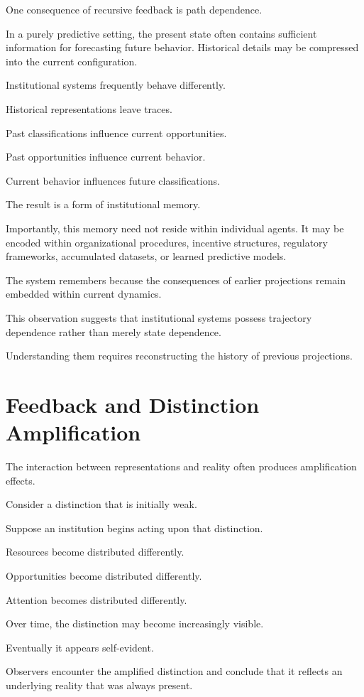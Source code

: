 \documentclass[11pt,oneside,openany]{book}
\begin{document}
One consequence of recursive feedback is path dependence.

In a purely predictive setting, the present state often contains sufficient information for forecasting future behavior. Historical details may be compressed into the current configuration.

Institutional systems frequently behave differently.

Historical representations leave traces.

Past classifications influence current opportunities.

Past opportunities influence current behavior.

Current behavior influences future classifications.

The result is a form of institutional memory.

Importantly, this memory need not reside within individual agents. It may be encoded within organizational procedures, incentive structures, regulatory frameworks, accumulated datasets, or learned predictive models.

The system remembers because the consequences of earlier projections remain embedded within current dynamics.

This observation suggests that institutional systems possess trajectory dependence rather than merely state dependence.

Understanding them requires reconstructing the history of previous projections.

\section{Feedback and Distinction Amplification}

The interaction between representations and reality often produces amplification effects.

Consider a distinction that is initially weak.

Suppose an institution begins acting upon that distinction.

Resources become distributed differently.

Opportunities become distributed differently.

Attention becomes distributed differently.

Over time, the distinction may become increasingly visible.

Eventually it appears self-evident.

Observers encounter the amplified distinction and conclude that it reflects an underlying reality that was always present.
\end{document}
